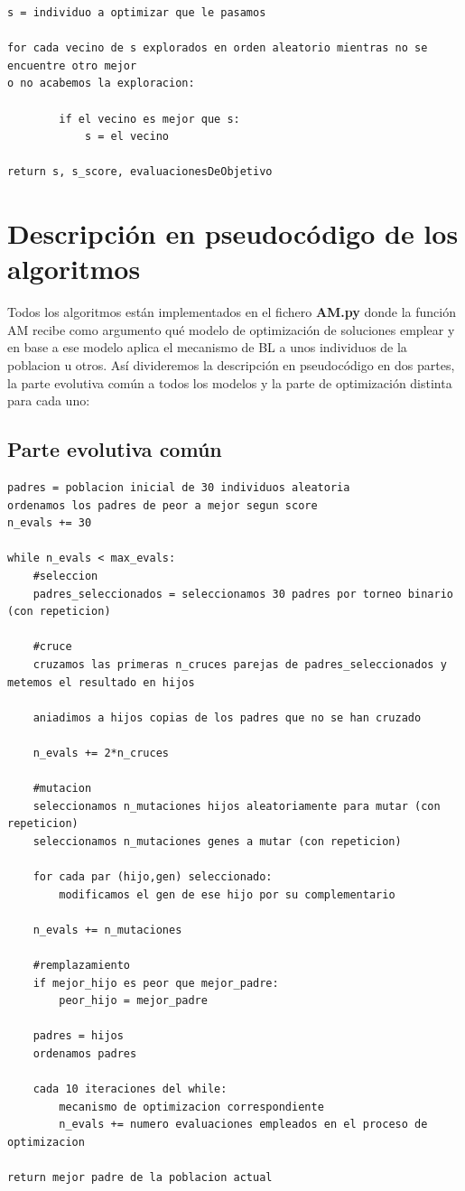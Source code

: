 \documentclass[10pt,a4paper]{article}
\begin{document}
\begin{lstlisting}
s = individuo a optimizar que le pasamos

for cada vecino de s explorados en orden aleatorio mientras no se encuentre otro mejor
o no acabemos la exploracion:
	
		if el vecino es mejor que s:
			s = el vecino		
			
return s, s_score, evaluacionesDeObjetivo
\end{lstlisting}

\newpage

\section{\color[rgb]{0.0,0.0,0.21}Descripción en pseudocódigo de los algoritmos}

Todos los algoritmos están implementados en el fichero \textbf{AM.py} donde la función AM recibe como argumento qué modelo de optimización de soluciones emplear y en base a ese modelo aplica el mecanismo de BL a unos individuos de la poblacion u otros. Así divideremos la descripción en pseudocódigo en dos partes, la parte evolutiva común a todos los modelos y la parte de optimización distinta para cada uno:\\

\subsection{\color[rgb]{0.0,0.0,0.51} Parte evolutiva común}

\begin{lstlisting}
padres = poblacion inicial de 30 individuos aleatoria
ordenamos los padres de peor a mejor segun score
n_evals += 30

while n_evals < max_evals:
	#seleccion
	padres_seleccionados = seleccionamos 30 padres por torneo binario (con repeticion)
	
	#cruce
	cruzamos las primeras n_cruces parejas de padres_seleccionados y metemos el resultado en hijos
	
	aniadimos a hijos copias de los padres que no se han cruzado
	
	n_evals += 2*n_cruces
	
	#mutacion
	seleccionamos n_mutaciones hijos aleatoriamente para mutar (con repeticion)
	seleccionamos n_mutaciones genes a mutar (con repeticion)
	
	for cada par (hijo,gen) seleccionado:
		modificamos el gen de ese hijo por su complementario
		
	n_evals += n_mutaciones
		
	#remplazamiento
	if mejor_hijo es peor que mejor_padre:
		peor_hijo = mejor_padre
		
	padres = hijos
	ordenamos padres
	
	cada 10 iteraciones del while:
		mecanismo de optimizacion correspondiente
		n_evals += numero evaluaciones empleados en el proceso de optimizacion
	
return mejor padre de la poblacion actual		
\end{lstlisting}
\end{document}

